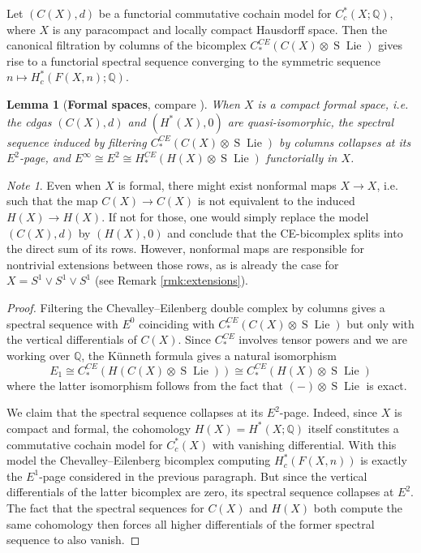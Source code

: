 \documentclass[12pt]{article}
\newcommand{\Q}{\mathbb{Q}}
\DeclareMathOperator{\Lie}{Lie}
\DeclareMathOperator{\Suspension}{S}
\theoremstyle{plain}
\newtheorem{lem}[thm]{Lemma}
\theoremstyle{definition}
\theoremstyle{remark}
\newtheorem{note}[thm]{Note}
\begin{document}
Let $(C(X),d)$ be a functorial commutative cochain model for $C^*_c(X;\Q)$, where $X$ is any paracompact and locally compact Hausdorff space. Then the canonical filtration by columns of the bicomplex $C^{CE}_*(C(X)\otimes \Suspension\Lie)$ gives rise to a functorial spectral sequence converging to the symmetric sequence $n\mapsto {H^{*}_c(F(X,n);\Q)}$. 



\begin{lem}[\textbf{Formal spaces}, {compare \cite[Remark 4.6]{TW19}}]\label{lem:formal spaces}
When $X$ is a compact formal space, i.e. the cdgas $(C(X),d)$ and  $(H^*(X),0)$ are quasi-isomorphic, the spectral sequence induced by filtering $C^{CE}_*(C(X)\otimes \Suspension\Lie)$ by columns collapses at its $E^2$-page, and $E^\infty \cong E^2 \cong H^{CE}_*( H(X)\otimes \Suspension\Lie)$ functorially in $X$.
\end{lem}

\begin{note}
Even when $X$ is formal, there might exist nonformal maps $X\to X$, i.e. such that the map $C(X)\to C(X)$ is not equivalent to the induced $H(X)\to H(X)$. If not for those, one would simply replace the model $(C(X),d)$ by $(H(X),0)$ and conclude that the CE-bicomplex splits into the direct sum of its rows. However, nonformal maps are responsible for nontrivial extensions between those rows, as is already the case for $X = S^1\vee S^1 \vee S^1$ (see Remark \ref{rmk:extensions}).
\end{note}

\begin{proof}
Filtering the Chevalley--Eilenberg double complex by columns gives a spectral sequence with $E^0$ coinciding with $C^{CE}_*(C(X)\otimes \Suspension\Lie)$ but only with the vertical differentials of $C(X)$. Since $C^{CE}_*$ involves tensor powers and we are working over $\Q$, the Künneth formula gives a natural isomorphism
\begin{equation}\label{eq:chevalley-eilenberg}
E_1 \cong C^{CE}_*(H(C(X)\otimes \Suspension \Lie)) \cong C^{CE}_*(H(X)\otimes \Suspension \Lie)
\end{equation}
where the latter isomorphism follows from the fact that $(-)\otimes \Suspension\Lie$ is exact.

We claim that the spectral sequence collapses at its $E^2$-page. Indeed, since $X$ is compact and formal, the cohomology $H(X) = H^*(X;\Q)$ itself constitutes a commutative cochain model for $C_c^{\ast}(X)$ with vanishing differential. With this model the Chevalley--Eilenberg bicomplex computing $H^{*}_c(F(X,n))$ is exactly the $E^1$-page considered in the previous paragraph. But since the vertical differentials of the latter bicomplex are zero, its spectral sequence collapses at $E^2$. The fact that the spectral sequences for $C(X)$ and $H(X)$ both compute the same cohomology then forces all higher differentials of the former spectral sequence to also vanish.
\end{proof}
\end{document}

